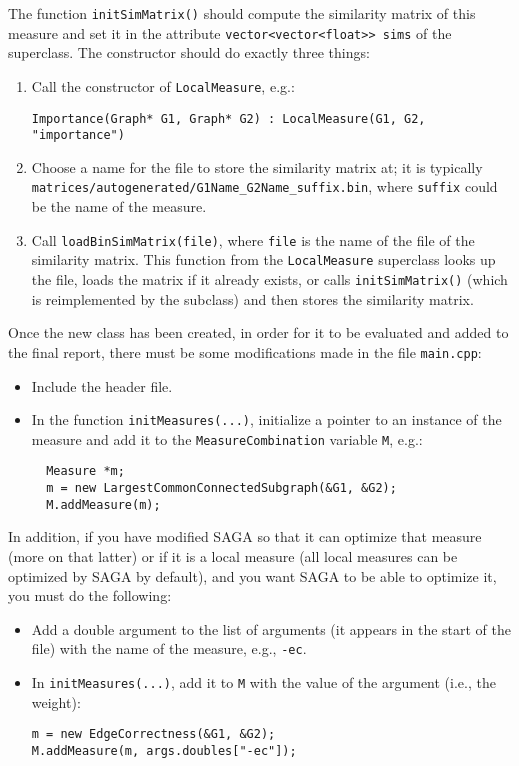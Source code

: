 \documentclass[]{article}
\begin{document}
The function \texttt{initSimMatrix()} should compute the similarity matrix of this measure and set it in the attribute \texttt{vector<vector<float>> sims} of the superclass.
The constructor should do exactly three things:
\begin{enumerate}
\item Call the constructor of \texttt{LocalMeasure}, e.g.:
\begin{verbatim}
Importance(Graph* G1, Graph* G2) : LocalMeasure(G1, G2, "importance")
\end{verbatim}
\item Choose a name for the file to store the similarity matrix at; it is typically \texttt{matrices/autogenerated/G1Name\_G2Name\_suffix.bin}, where \texttt{suffix} could be the name of the measure.
\item Call \texttt{loadBinSimMatrix(file)}, where \texttt{file} is the name of the file of the similarity matrix. This function from the \texttt{LocalMeasure} superclass looks up the file, loads the matrix if it already exists, or calls \texttt{initSimMatrix()} (which is reimplemented by the subclass) and then stores the similarity matrix.
\end{enumerate}

Once the new class has been created, in order for it to be evaluated and added to the final report, there must be some modifications made in the file \texttt{main.cpp}:
\begin{itemize}
\item Include the header file.
\item In the function \texttt{initMeasures(...)}, initialize a pointer to an instance of the measure and add it to the \texttt{MeasureCombination} variable \texttt{M}, e.g.:
\begin{verbatim}
  Measure *m;
  m = new LargestCommonConnectedSubgraph(&G1, &G2);
  M.addMeasure(m);
\end{verbatim}
\end{itemize}
In addition, if you have modified SAGA so that it can optimize that measure (more on that latter) or if it is a local measure (all local measures can be optimized by SAGA by default), and you want SAGA to be able to optimize it, you must do the following:
\begin{itemize}
\item Add a double argument to the list of arguments (it appears in the start of the file) with the name of the measure, e.g., \texttt{-ec}.
\item In \texttt{initMeasures(...)}, add it to \texttt{M} with the value of the argument (i.e., the weight):
\begin{verbatim}
m = new EdgeCorrectness(&G1, &G2);
M.addMeasure(m, args.doubles["-ec"]);
\end{verbatim}
\end{itemize}
\end{document}
